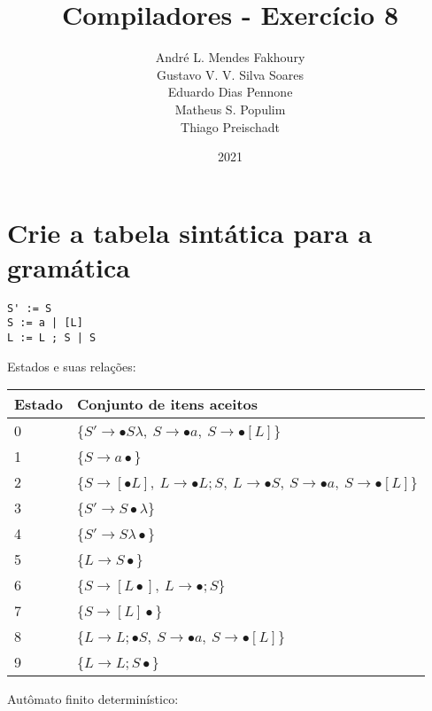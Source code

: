 \documentclass{article}
\title{Compiladores - Exercício 8}
\author{André L. Mendes Fakhoury\\
Gustavo V. V. Silva Soares\\
Eduardo Dias Pennone\\
Matheus S. Populim\\
Thiago Preischadt\\
}
\date{2021}
\begin{document}
\maketitle

\section{Crie a tabela sintática para a gramática }
\begin{lstlisting}
S' := S 
S := a | [L] 
L := L ; S | S 
\end{lstlisting}


Estados e suas relações:


\begin{table}[h]
\begin{tabular}{|l|l|}
\hline
Estado & Conjunto de itens aceitos \\ \hline
0 &   \{$S' \rightarrow \bullet S \lambda ,\: S \rightarrow \bullet a,\: S \rightarrow \bullet [ L ] $\} \\\hline
1 & \{$S \rightarrow a \bullet $\}  \\ \hline
2 & \{$S \rightarrow [ \bullet L ],\: L \rightarrow \bullet L ; S,\: L \rightarrow \bullet S,\: S \rightarrow \bullet a,\: S \rightarrow \bullet [ L ]  $\} \\ \hline
3 & \{$ S' \rightarrow S \bullet \lambda $\} \\ \hline
4 & \{$ S' \rightarrow S \lambda \bullet $\} \\ \hline
5 & \{$ L \rightarrow S \bullet $\} \\ \hline
6 & \{$ S \rightarrow [ L \bullet ],\: L \rightarrow \bullet ; S $\} \\ \hline
7 & \{$ S \rightarrow [ L ]\bullet $\} \\ \hline
8 & \{$ L \rightarrow L ; \bullet S,\: S \rightarrow \bullet a,\: S \rightarrow \bullet [ L ] $\} \\ \hline
9 & \{$ L \rightarrow L ; S \bullet $\} \\ \hline
\end{tabular}
\end{table}


\newpage

Autômato finito determinístico:
\end{document}
